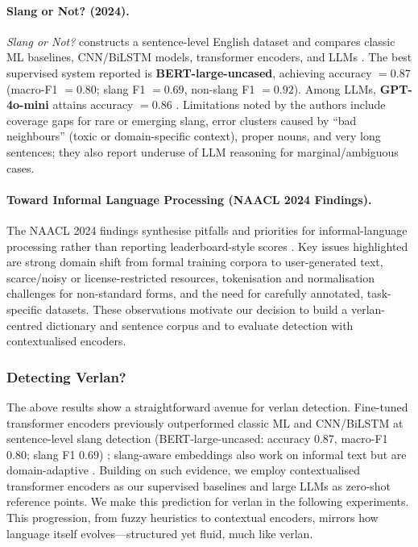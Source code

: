\documentclass[12pt]{article}
\begin{document}
\paragraph{Slang or Not? (2024).}
\textit{Slang or Not?} constructs a sentence-level English dataset and compares classic ML baselines, CNN/BiLSTM models, transformer encoders, and LLMs \cite{slangornot2024}. The best supervised system reported is \textbf{BERT-large-uncased}, achieving accuracy $=0.87$ (macro-F1 $=0.80$; slang F1 $=0.69$, non-slang F1 $=0.92$). Among LLMs, \textbf{GPT-4o-mini} attains accuracy $=0.86$ \cite{slangornot2024}. Limitations noted by the authors include coverage gaps for rare or emerging slang, error clusters caused by “bad neighbours” (toxic or domain-specific context), proper nouns, and very long sentences; they also report underuse of LLM reasoning for marginal/ambiguous cases. \cite{slangornot2024}

\paragraph{Toward Informal Language Processing (NAACL 2024 Findings).}
The NAACL 2024 findings synthesise pitfalls and priorities for informal-language processing rather than reporting leaderboard-style scores \cite{sun2024informal}. Key issues highlighted are strong domain shift from formal training corpora to user-generated text, scarce/noisy or license-restricted resources, tokenisation and normalisation challenges for non-standard forms, and the need for carefully annotated, task-specific datasets. These observations motivate our decision to build a verlan-centred dictionary and sentence corpus and to evaluate detection with contextualised encoders. \cite{sun2024informal}


\subsubsection{Detecting Verlan?}

The above results show a straightforward avenue for verlan detection. Fine-tuned transformer encoders previously outperformed classic ML and CNN/BiLSTM at sentence-level slang detection (BERT-large-uncased: accuracy 0.87, macro-F1 0.80; slang F1 0.69) \cite{slangornot2024}; slang-aware embeddings also work on informal text but are domain-adaptive \cite{urban2020embeddings}. Building on such evidence, we employ contextualised transformer encoders as our supervised baselines and large LLMs as zero-shot reference points. We make this prediction for verlan in the following experiments. This progression, from fuzzy heuristics to contextual encoders, mirrors how language itself evolves\;---\;structured yet fluid, much like verlan.
\end{document}
